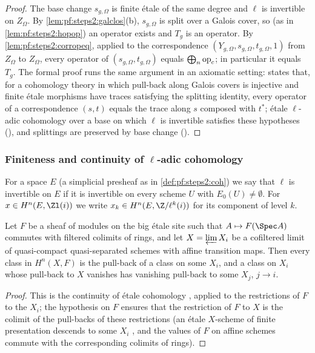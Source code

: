 \begin{proof}
The base change $s_{g,\Omega}$ is finite \'etale of the same degree and $\ell$ is invertible on
$Z_\Omega$. By \cref{lem:pf:steps2:galclos}(b), $s_{g,\Omega}$ is split over a Galois cover, so (as in
\cref{lem:pf:steps2:hopop}) an operator exists and $T_g$ is an operator. By
\cref{lem:pf:steps2:corropeq}, applied to the correspondence $(Y_{g,\Omega},s_{g,\Omega},t_{g,\Omega},
1)$ from $Z_\Omega$ to $Z_\Omega$, every operator of $(s_{g,\Omega},t_{g,\Omega})$ equals
$\bigoplus_n\mathrm{op}_c$; in particular it equals $T_g$. The formal proof runs the same argument in
an axiomatic setting:  states that, for a cohomology theory in
which pull-back along Galois covers is injective and finite \'etale morphisms have traces satisfying
the splitting identity, every operator of a correspondence $(s,t)$ equals the trace along $s$
composed with $t^\ast$; \'etale $\ell$-adic cohomology over a base on which $\ell$ is invertible
satisfies these hypotheses (), and
splittings are preserved by base change ().
\end{proof}

\subsubsection{Finiteness and continuity of \texorpdfstring{$\ell$}{l}-adic cohomology}

For a space $E$ (a simplicial presheaf as in \cref{def:pf:steps2:coh}) we say that $\ell$ is
invertible on $E$ if it is invertible on every scheme $U$ with $E_0(U)\ne\emptyset$. For $x\in
H^n(E,\Zl(i))$ we write $x_k\in H^n(E,\Z/\ell^k(i))$ for its component of level $k$.

\begin{lemma}[Limits]\label{lem:pf:steps2:limits}
Let $F$ be a sheaf of modules on the big \'etale site such that $A\mapsto F(\Spec A)$ commutes with
filtered colimits of rings, and let $X=\varprojlim X_i$ be a cofiltered limit of quasi-compact
quasi-separated schemes with affine transition maps. Then every class in $H^n(X,F)$ is the pull-back
of a class on some $X_i$, and a class on $X_i$ whose pull-back to $X$ vanishes has vanishing
pull-back to some $X_j$, $j\to i$.
\end{lemma}

\begin{proof}
This is the continuity of \'etale cohomology \cite[Exp.~VII, 5.7]{ArtinGrothendieckVerdier1972},
applied to the restrictions of $F$ to the $X_i$; the hypothesis on $F$ ensures that the restriction
of $F$ to $X$ is the colimit of the pull-backs of these restrictions (an \'etale $X$-scheme of finite
presentation descends to some $X_i$ \cite[8.8.2]{Grothendieck1967}, and the values of $F$ on affine
schemes commute with the corresponding colimits of rings).
\end{proof}

